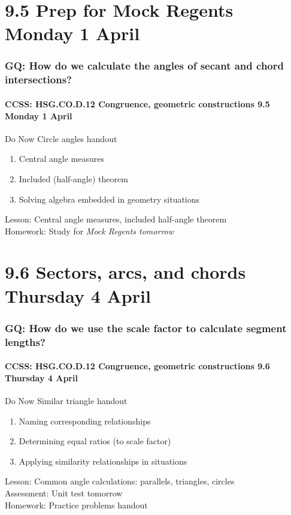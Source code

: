 \documentclass{beamer}
\begin{document}
\section{9.5 Prep for Mock Regents Monday 1 April}
\frame
{
  \frametitle{GQ: How do we calculate the angles of secant and chord intersections?}
  \framesubtitle{CCSS: HSG.CO.D.12 Congruence, geometric constructions \hfill \alert{9.5 Monday 1 April}}

    \begin{block}{Do Now Circle angles handout}
      \begin{enumerate}
        \item Central angle measures
        \item Included (half-angle) theorem
        \item Solving algebra embedded in geometry situations
      \end{enumerate}
    \end{block}
  Lesson: Central angle measures, included half-angle theorem\\
  Homework: Study for \emph{Mock Regents tomorrow}
}

\section{9.6 Sectors, arcs, and chords Thursday 4 April}
  \frame
  {
    \frametitle{GQ: How do we use the scale factor to calculate segment lengths?}
    \framesubtitle{CCSS: HSG.CO.D.12 Congruence, geometric constructions \hfill \alert{9.6 Thursday 4 April}}

    \begin{block}{Do Now Similar triangle handout}
      \begin{enumerate}
        \item Naming corresponding relationships
        \item Determining equal ratios (to scale factor)
        \item Applying similarity relationships in situations
      \end{enumerate}
    \end{block}
    Lesson: Common angle calculations: parallels, triangles, circles\\
    Assessment: \alert{Unit test tomorrow}\\[0.5cm]
    Homework: Practice problems handout
  }
\end{document}
